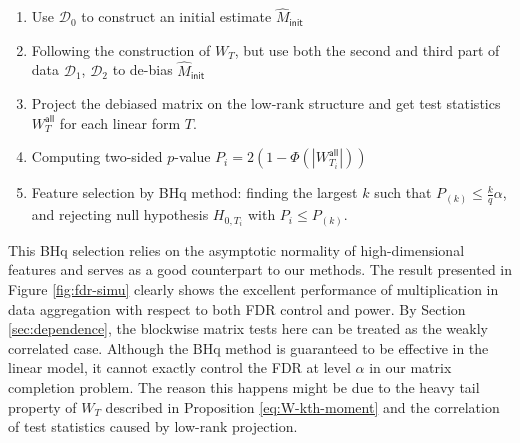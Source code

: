 \documentclass[12pt]{article}
\newcommand{\abs}[1]{\left\lvert#1\right\rvert}
\newcommand{\cD}{\mathcal{D}}
\theoremstyle{plain}
\begin{document}
\begin{sloppypar}
\begin{enumerate}
    \item Use $\cD_0$ to construct an initial estimate $\widehat{M}_{\mathsf{init}}$ 
    \item Following the construction of $W_T$, but use both the second and third part of data $\cD_1$, $\cD_2$ to de-bias $\widehat{M}_{\mathsf{init}}$
    \item Project the debiased matrix on the low-rank structure and get test statistics $W_T^{\mathsf{all} }$ for each linear form $T$.
    \item Computing two-sided $p$-value $P_i=2(1-\Phi(\abs{W_{T_i}^{\mathsf{all}} }))$
    \item Feature selection by BHq method: finding the largest $k$ such that $P_{(k)} \leq \frac{k}{q} \alpha$, and rejecting null hypothesis $H_{0,T_i }$ with  $P_i\le P_{(k)}$.
\end{enumerate}
This BHq selection relies on the asymptotic normality of high-dimensional features and serves as a good counterpart to our methods. 
The result presented in Figure \ref{fig:fdr-simu} clearly shows the excellent performance of multiplication in data aggregation with respect to both FDR control and power. By Section \ref{sec:dependence}, the blockwise matrix tests here can be treated as the weakly correlated case. Although the BHq method \cite{benjamini1995controlling} is guaranteed to be effective in the linear model, it cannot exactly control the FDR at level $\alpha$ in our matrix completion problem. The reason this happens might be due to the heavy tail property of $W_T$ described in Proposition \ref{eq:W-kth-moment} and the correlation of test statistics caused by low-rank projection.





\end{sloppypar}
\end{document}
